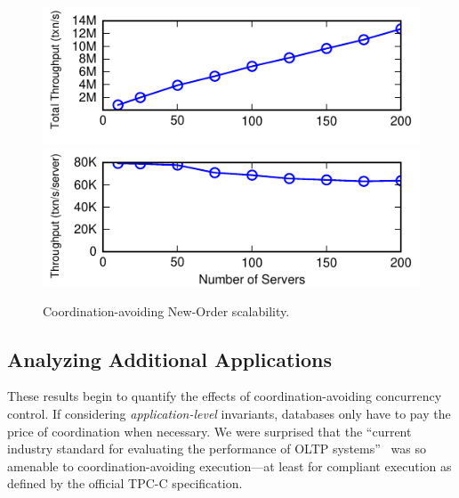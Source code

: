 \begin{figure}
\includegraphics[width=\columnwidth]{figs/scale_thru_total.pdf}\vspace{-.5em}
\includegraphics[width=\columnwidth]{figs/scale_thru_each.pdf}\vspace{-.5em}
\caption{Coordination-avoiding New-Order scalability.}
\label{fig:scaleout}
\end{figure}

\subsection{Analyzing Additional Applications}

These results begin to quantify the effects of coordination-avoiding
concurrency control. If considering \textit{application-level}
invariants, databases only have to pay the price of coordination when
necessary. We were surprised that the ``current industry standard for
evaluating the performance of OLTP systems''~\cite{oltpbench} was so
amenable to coordination-avoiding execution---at least for compliant
execution as defined by the official TPC-C specification.

